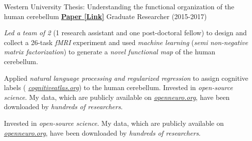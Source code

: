 \begin{cventries}
  \cventry
    {Western University} %
    {Thesis: Understanding the functional organization of the human cerebellum}
    {\href{http://ivrylab.berkeley.edu/uploads/4/1/1/5/41152143/functional_boundaries_in_the_human_cerebellum.pdf}{\textbf{Paper [Link]}}}
    {Graduate Researcher (2015-2017)} %
    {
      \begin{cvitems} %
      	\item {\textit{Led a team of 2} (1 research assistant and one post-doctoral fellow) to design and collect a 26-task \textit{fMRI} experiment and used \textit{machine learning} (\textit{semi non-negative matrix factorization}) to generate a \textit{novel functional map} of the human cerebellum.}
      	\item {Applied \textit{natural language processing and regularized regression} to assign cognitive labels ( {\href{https://cognitiveatlas.org/}{\textit{cognitiveatlas.org}}}) to the human cerebellum. Invested in \textit{open-source science}. My data, which are publicly available on {\href{https://openneuro.org/datasets/ds002105/versions/1.1.0}{\textit{openneuro.org}}}, have been downloaded by \textit{hundreds of researchers}.}
      	\item {Invested in \textit{open-source science}. My data, which are publicly available on {\href{https://openneuro.org/datasets/ds002105/versions/1.1.0}{\textit{openneuro.org}}}, have been downloaded by \textit{hundreds of researchers}.}
      \end{cvitems}
    }
\end{cventries}
